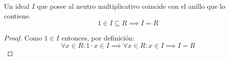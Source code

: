 \begin{thm}
    Un ideal $I$ que posee al neutro multiplicativo coincide con el anillo que lo contiene.
    \begin{equation}
        1 \in I \subseteq R \implies I = R
    \end{equation}
\end{thm}

\begin{proof}
    Como $1 \in I$ entonces, por definición: 
    \begin{equation}
        \forall x \in R: 1 \cdot x \in I \implies \forall x \in R: x \in I \implies I = R
    \end{equation}
\end{proof}
